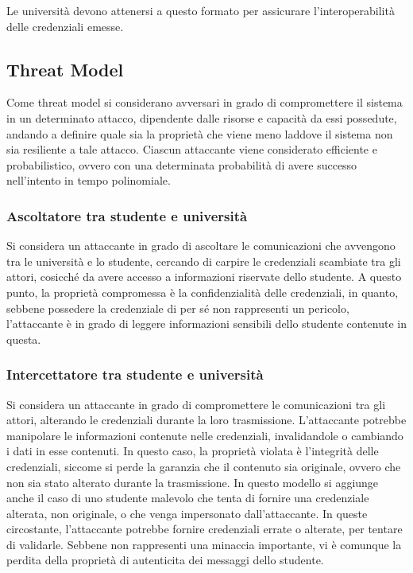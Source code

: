 \documentclass[a4paper,12pt]{article}
\begin{document}
Le università devono attenersi a questo formato per assicurare l'interoperabilità delle credenziali emesse.
\subsection{Threat Model}
Come threat model si considerano avversari in grado di compromettere il sistema in un determinato attacco, dipendente dalle risorse e capacità da essi possedute, andando a definire quale sia la proprietà che viene meno laddove il sistema non sia resiliente a tale attacco.
\newline Ciascun attaccante viene considerato efficiente e probabilistico, ovvero con una determinata probabilità di avere successo nell'intento in tempo polinomiale.
\subsubsection{Ascoltatore tra studente e università} Si considera un attaccante in grado di ascoltare le comunicazioni che avvengono tra le università e lo studente, cercando di carpire le credenziali scambiate tra gli attori, cosicché da avere accesso a informazioni riservate dello studente.
\newline A questo punto, la proprietà compromessa è la confidenzialità delle credenziali, in quanto, sebbene possedere la credenziale di per sé non rappresenti un pericolo, l'attaccante è in grado di leggere informazioni sensibili dello studente contenute in questa.
\subsubsection{Intercettatore tra studente e università} Si considera un attaccante in grado di compromettere le comunicazioni tra gli attori, alterando le credenziali durante la loro trasmissione. L'attaccante potrebbe manipolare le informazioni contenute nelle credenziali, invalidandole o cambiando i dati in esse contenuti.
\newline In questo caso, la proprietà violata è l'integrità delle credenziali, siccome si perde la garanzia che il contenuto sia originale, ovvero che non sia stato alterato durante la trasmissione.
\newline In questo modello si aggiunge anche il caso di uno studente malevolo che tenta di fornire una credenziale alterata, non originale, o che venga impersonato dall'attaccante. In queste circostante, l'attaccante potrebbe fornire credenziali errate o alterate, per tentare di validarle.
\newline Sebbene non rappresenti una minaccia importante, vi è comunque la perdita della proprietà di autenticita dei messaggi dello studente.
\end{document}
